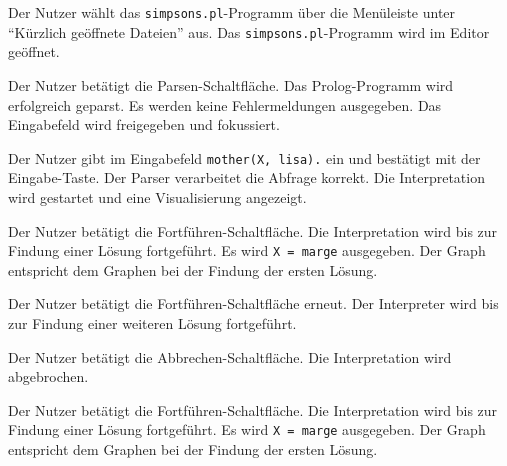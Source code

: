 \documentclass[parskip=full,11pt,twoside]{scrartcl}
\begin{document}
{Der Nutzer wählt das \texttt{simpsons.pl}-Programm über die Menüleiste unter \enquote{Kürzlich geöffnete Dateien} aus.}
{Das \texttt{simpsons.pl}-Programm wird im Editor geöffnet.}

{Der Nutzer betätigt die Parsen-Schaltfläche.}
{Das Prolog-Programm wird erfolgreich geparst. Es werden keine Fehlermeldungen ausgegeben. Das Eingabefeld wird freigegeben und fokussiert.}

{Der Nutzer gibt im Eingabefeld \texttt{mother(X, lisa).} ein und bestätigt mit der Eingabe-Taste.}
{Der Parser verarbeitet die Abfrage korrekt. Die Interpretation wird gestartet und eine Visualisierung angezeigt.}

{Der Nutzer betätigt die Fortführen-Schaltfläche.}
{Die Interpretation wird bis zur Findung einer Lösung fortgeführt. Es wird \texttt{X = marge} ausgegeben. Der Graph entspricht dem Graphen bei der Findung der ersten Lösung.}

{Der Nutzer betätigt die Fortführen-Schaltfläche erneut.}
{Der Interpreter wird bis zur Findung einer weiteren Lösung fortgeführt.}

{Der Nutzer betätigt die Abbrechen-Schaltfläche.}
{Die Interpretation wird abgebrochen.}


{Der Nutzer betätigt die Fortführen-Schaltfläche.}
{Die Interpretation wird bis zur Findung einer Lösung fortgeführt. Es wird \texttt{X = marge} ausgegeben. Der Graph entspricht dem Graphen bei der Findung der ersten Lösung.}
\end{document}
